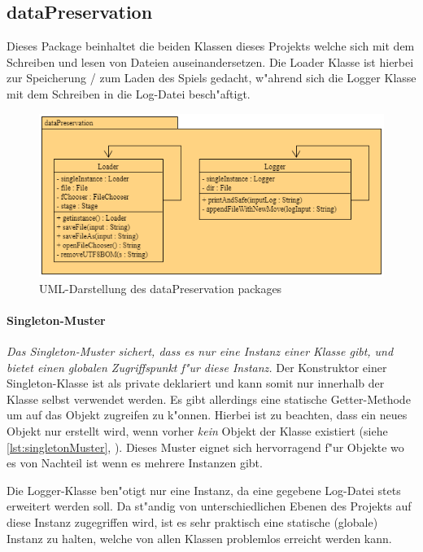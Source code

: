 \subsection{dataPreservation}
\label{ss:dataPreservation}
Dieses Package beinhaltet die beiden Klassen dieses Projekts welche sich mit dem Schreiben und lesen von Dateien auseinandersetzen. Die Loader Klasse ist hierbei zur Speicherung / zum Laden des Spiels gedacht, w"ahrend sich die Logger Klasse mit dem Schreiben in die Log-Datei besch"aftigt. 

\begin{figure}
	\centering
	\includegraphics{pics/dataPreservationPackage}
	\caption{UML-Darstellung des dataPreservation packages}
	\label{fig:dataPreservationPackage}
\end{figure}

\paragraph{Singleton-Muster}
\label{par:singletonMuster}
\emph{Das Singleton-Muster sichert, dass es nur eine Instanz einer Klasse gibt, und bietet einen globalen Zugriffspunkt f"ur diese Instanz.} \cite{Freeman2006}
Der Konstruktor einer Singleton-Klasse ist als private deklariert und kann somit nur innerhalb der Klasse selbst verwendet werden. Es gibt allerdings eine statische Getter-Methode um auf das Objekt zugreifen zu k"onnen. Hierbei ist zu beachten, dass ein neues Objekt nur erstellt wird, wenn vorher \emph{kein} Objekt der Klasse existiert (siehe \ref{lst:singletonMuster}, ). Dieses Muster eignet sich hervorragend f"ur Objekte wo es von Nachteil ist wenn es mehrere Instanzen gibt. 

Die Logger-Klasse ben"otigt nur eine Instanz, da eine gegebene Log-Datei stets erweitert werden soll. Da st"andig von unterschiedlichen Ebenen des Projekts auf diese Instanz zugegriffen wird, ist es sehr praktisch eine statische (globale) Instanz zu halten, welche von allen Klassen problemlos erreicht werden kann. 

